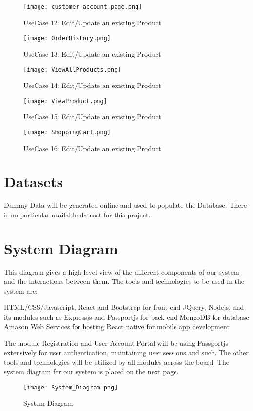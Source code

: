 \begin{figure}
  \caption{UseCase 12: Edit/Update an existing Product}
  \texttt{[image: customer\_account\_page.png]}
  \centering
\end{figure}
\begin{figure}
  \caption{UseCase 13: Edit/Update an existing Product}
  \texttt{[image: OrderHistory.png]}
  \centering
\end{figure}
\begin{figure}
  \caption{UseCase 14: Edit/Update an existing Product}
  \texttt{[image: ViewAllProducts.png]}
  \centering
\end{figure}
\begin{figure}
  \caption{UseCase 15: Edit/Update an existing Product}
  \texttt{[image: ViewProduct.png]}
  \centering
\end{figure}
\begin{figure}
  \caption{UseCase 16: Edit/Update an existing Product}
  \texttt{[image: ShoppingCart.png]}
  \centering
\end{figure}


\section{Datasets}
Dummy Data will be generated online and used to populate the Database. There is no particular available dataset for this project.

\section{System Diagram}
This diagram gives a high-level view of the different components of our system and the interactions between them.
The tools and technologies to be used in the system are:
\begin{outline}
    \1 HTML/CSS/Javascript, React and Bootstrap for front-end
    \1 JQuery, Nodejs, and its modules such as Expressjs and Passportjs for back-end
    \1 MongoDB for database
    \1 Amazon Web Services for hosting
    \1 React native for mobile app development
\end{outline}
The module Registration and User Account Portal will be using Passportjs extensively for user authentication, maintaining user sessions and such. The other tools and technologies will be utilized by all modules across the board.
    The system diagram for our system is placed on the next page.

\begin{figure}
  \caption{System Diagram}
  \texttt{[image: System\_Diagram.png]}
  \centering
\end{figure}